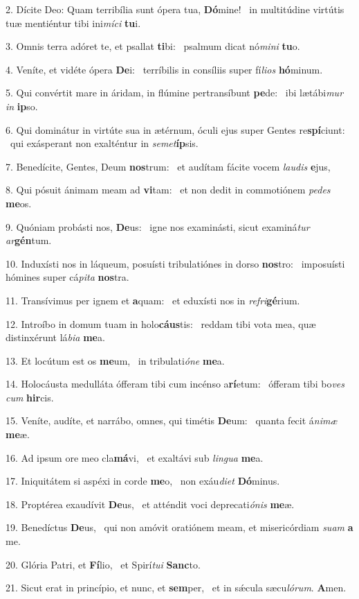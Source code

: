 2. Dícite Deo: Quam terribília sunt ópera tua, \textbf{Dó}mine! \ast\  in multitúdine virtútis tuæ mentiéntur tibi ini\textit{mí}\textit{ci} \textbf{tu}i.\

3. Omnis terra adóret te, et psallat \textbf{ti}bi: \ast\  psalmum dicat nó\textit{mi}\textit{ni} \textbf{tu}o.\

4. Veníte, et vidéte ópera \textbf{De}i: \ast\  terríbilis in consíliis super fí\textit{li}\textit{os} \textbf{hó}minum.\

5. Qui convértit mare in áridam, in flúmine pertransíbunt \textbf{pe}de: \ast\  ibi lætábi\textit{mur} \textit{in} \textbf{ip}so.\

6. Qui dominátur in virtúte sua in ætérnum, óculi ejus super Gentes re\textbf{spí}ciunt: \ast\  qui exásperant non exalténtur in \textit{se}\textit{met}\textbf{íp}sis.\

7. Benedícite, Gentes, Deum \textbf{nos}trum: \ast\  et audítam fácite vocem \textit{lau}\textit{dis} \textbf{e}jus,\

8. Qui pósuit ánimam meam ad \textbf{vi}tam: \ast\  et non dedit in commotiónem \textit{pe}\textit{des} \textbf{me}os.\

9. Quóniam probásti nos, \textbf{De}us: \ast\  igne nos examinásti, sicut examiná\textit{tur} \textit{ar}\textbf{gén}tum.\

10. Induxísti nos in láqueum, posuísti tribulatiónes in dorso \textbf{nos}tro: \ast\  imposuísti hómines super cá\textit{pi}\textit{ta} \textbf{nos}tra.\

11. Transívimus per ignem et \textbf{a}quam: \ast\  et eduxísti nos in \textit{re}\textit{fri}\textbf{gé}rium.\

12. Introíbo in domum tuam in holo\textbf{cáus}tis: \ast\  reddam tibi vota mea, quæ distinxérunt lá\textit{bi}\textit{a} \textbf{me}a.\

13. Et locútum est os \textbf{me}um, \ast\  in tribulati\textit{ó}\textit{ne} \textbf{me}a.\

14. Holocáusta medulláta ófferam tibi cum incénso a\textbf{rí}etum: \ast\  ófferam tibi bo\textit{ves} \textit{cum} \textbf{hir}cis.\

15. Veníte, audíte, et narrábo, omnes, qui timétis \textbf{De}um: \ast\  quanta fecit á\textit{ni}\textit{mæ} \textbf{me}æ.\

16. Ad ipsum ore meo cla\textbf{má}vi, \ast\  et exaltávi sub \textit{lin}\textit{gua} \textbf{me}a.\

17. Iniquitátem si aspéxi in corde \textbf{me}o, \ast\  non exáu\textit{di}\textit{et} \textbf{Dó}minus.\

18. Proptérea exaudívit \textbf{De}us, \ast\  et atténdit voci deprecati\textit{ó}\textit{nis} \textbf{me}æ.\

19. Benedíctus \textbf{De}us, \ast\  qui non amóvit oratiónem meam, et misericórdiam \textit{su}\textit{am} \textbf{a} me.\

20. Glória Patri, et \textbf{Fí}lio, \ast\  et Spirí\textit{tu}\textit{i} \textbf{Sanc}to.\

21. Sicut erat in princípio, et nunc, et \textbf{sem}per, \ast\  et in sǽcula sæcu\textit{ló}\textit{rum}. \textbf{A}men.\

